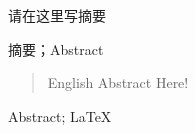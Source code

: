 

\begin{zhaiyao}
请在这里写摘要
\end{zhaiyao}




\begin{guanjianci}
摘要；Abstract
\end{guanjianci}



\begin{abstract}
English Abstract Here!

\end{abstract}



\begin{keywords}
Abstract; \LaTeX
\end{keywords} 